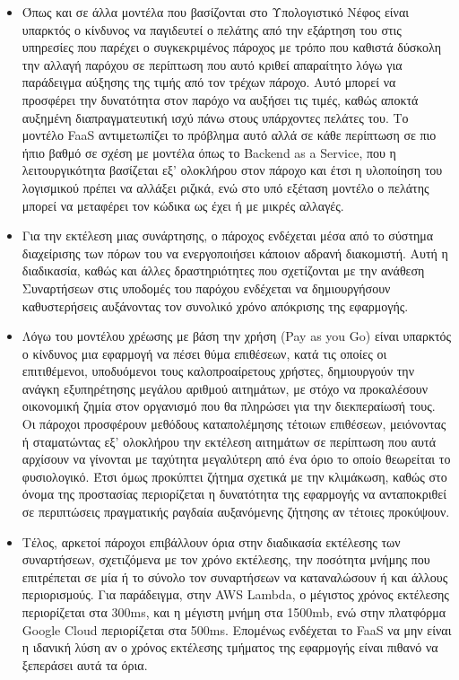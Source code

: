 \documentclass{article}
\begin{document}
\begin{itemize}
\item Όπως και σε άλλα μοντέλα που βασίζονται στο Υπολογιστικό Νέφος είναι υπαρκτός ο κίνδυνος να παγιδευτεί ο πελάτης από την εξάρτηση του στις υπηρεσίες που παρέχει ο συγκεκριμένος πάροχος με τρόπο που καθιστά δύσκολη την αλλαγή παρόχου σε περίπτωση που αυτό κριθεί απαραίτητο λόγω για παράδειγμα αύξησης της τιμής από τον τρέχων πάροχο. Αυτό μπορεί να προσφέρει την δυνατότητα στον παρόχο να αυξήσει τις τιμές, καθώς αποκτά αυξημένη διαπραγματευτική ισχύ πάνω στους υπάρχοντες πελάτες του. Το μοντέλο FaaS αντιμετωπίζει το πρόβλημα αυτό αλλά σε κάθε περίπτωση σε πιο ήπιο βαθμό σε σχέση με μοντέλα όπως το  Backend as a Service,  που η λειτουργικότητα βασίζεται εξ' ολοκλήρου στον πάροχο και έτσι η υλοποίηση του λογισμικού πρέπει να αλλάξει ριζικά, ενώ στο υπό εξέταση μοντέλο ο πελάτης μπορεί να μεταφέρει τον κώδικα ως έχει ή με μικρές αλλαγές.
\item Για την εκτέλεση μιας συνάρτησης, ο πάροχος ενδέχεται μέσα από το σύστημα διαχείρισης των πόρων του να ενεργοποιήσει κάποιον αδρανή διακομιστή. Αυτή η διαδικασία, καθώς και άλλες δραστηριότητες που σχετίζονται με την ανάθεση Συναρτήσεων στις υποδομές του παρόχου ενδέχεται να δημιουργήσουν καθυστερήσεις αυξάνοντας τον συνολικό χρόνο απόκρισης της εφαρμογής.
\item Λόγω του μοντέλου χρέωσης με βάση την χρήση (Pay as you Go) είναι υπαρκτός ο κίνδυνος μια εφαρμογή να πέσει θύμα επιθέσεων, κατά τις οποίες οι επιτιθέμενοι, υποδυόμενοι τους καλοπροαίρετους χρήστες, δημιουργούν την ανάγκη εξυπηρέτησης μεγάλου αριθμού αιτημάτων, με στόχο να προκαλέσουν οικονομική ζημία στον οργανισμό που θα πληρώσει για την διεκπεραίωσή τους. Οι πάροχοι προσφέρουν μεθόδους καταπολέμησης τέτοιων επιθέσεων, μειόνοντας ή σταματώντας εξ' ολοκλήρου την εκτέλεση αιτημάτων σε περίπτωση που αυτά αρχίσουν να γίνονται με ταχύτητα μεγαλύτερη από ένα όριο το οποίο θεωρείται το φυσιολογικό. Έτσι όμως προκύπτει ζήτημα σχετικά με την κλιμάκωση, καθώς στο όνομα της προστασίας περιορίζεται η δυνατότητα της εφαρμογής να ανταποκριθεί σε περιπτώσεις πραγματικής ραγδαία αυξανόμενης ζήτησης αν τέτοιες προκύψουν.
\item Τέλος, αρκετοί πάροχοι επιβάλλουν όρια στην διαδικασία εκτέλεσης των συναρτήσεων, σχετιζόμενα με τον χρόνο εκτέλεσης, την ποσότητα μνήμης που επιτρέπεται σε μία ή το σύνολο τον συναρτήσεων να καταναλώσουν ή και άλλους περιορισμούς. Για παράδειγμα, στην AWS Lambda, ο μέγιστος χρόνος εκτέλεσης περιορίζεται στα 300ms, και η μέγιστη μνήμη στα 1500mb, ενώ στην πλατφόρμα Google Cloud περιορίζεται στα 500ms. Επομένως ενδέχεται το FaaS να μην είναι η ιδανική λύση αν ο χρόνος εκτέλεσης τμήματος της εφαρμογής είναι πιθανό να ξεπεράσει αυτά τα όρια. 
\end{itemize}
\end{document}
